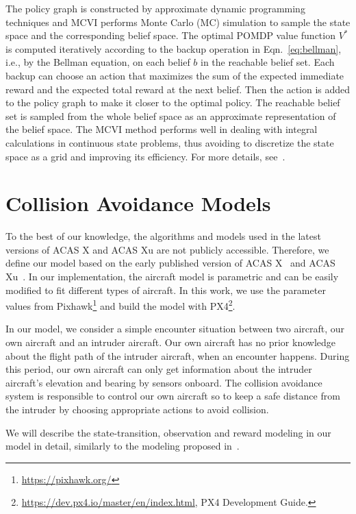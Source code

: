 \documentclass[orivec]{llncs}
\begin{document}
The policy graph is constructed by approximate dynamic programming techniques and MCVI performs Monte Carlo (MC) simulation to sample the state space and the corresponding belief space. 
The optimal POMDP value function $V^{*}$ is computed iteratively according to the backup operation in Eqn.~\eqref{eq:bellman}, i.e., by the Bellman equation, on each belief $b$ in the reachable belief set. 
Each backup can choose an action that maximizes the sum of the expected immediate reward and the expected total reward at the next belief. 
Then the action is added to the policy graph to make it closer to the optimal policy. 
The reachable belief set is sampled from the whole belief space as an approximate representation of the belief space. 
The MCVI method performs well in dealing with integral calculations in continuous state problems, thus avoiding to discretize the state space as a grid and improving its efficiency. 
For more details, see~\cite{MCVI}.


\section{Collision Avoidance Models}
\label{sec:collisionAvoidanceModels}

To the best of our knowledge, the algorithms and models used in the latest versions of ACAS X and ACAS Xu are not publicly accessible.
Therefore, we define our model based on the early published version of ACAS X~\cite{ACASX} and ACAS Xu~\cite{DBLP:conf/rss/Bai-RSS-11}.
In our implementation, the aircraft model is parametric and can be easily modified to fit different types of aircraft.
In this work, we use the parameter values from Pixhawk\footnote{\url{https://pixhawk.org/}} and build the model with PX4\footnote{\url{https://dev.px4.io/master/en/index.html}, PX4 Development Guide.}. 

In our model, we consider a simple encounter situation between two aircraft, our own aircraft and an intruder aircraft.
Our own aircraft has no prior knowledge about the flight path of the intruder aircraft, when an encounter happens.
During this period, our own aircraft can only get information about the intruder aircraft's elevation and bearing by sensors onboard.
The collision avoidance system is responsible to control our own aircraft so to keep a safe distance from the intruder by choosing appropriate actions to avoid collision. 

We will describe the state-transition, observation and reward modeling in our model in detail, similarly to the modeling proposed in~\cite{DBLP:conf/rss/Bai-RSS-11}.
\end{document}
